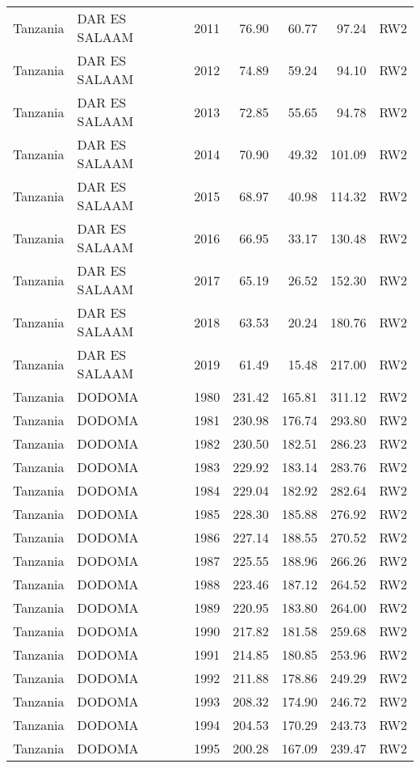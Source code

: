 \begin{longtable}{lllrrrl}
  Tanzania & DAR ES SALAAM & 2011 & 76.90 & 60.77 & 97.24 & RW2 \\ 
  Tanzania & DAR ES SALAAM & 2012 & 74.89 & 59.24 & 94.10 & RW2 \\ 
  Tanzania & DAR ES SALAAM & 2013 & 72.85 & 55.65 & 94.78 & RW2 \\ 
  Tanzania & DAR ES SALAAM & 2014 & 70.90 & 49.32 & 101.09 & RW2 \\ 
  Tanzania & DAR ES SALAAM & 2015 & 68.97 & 40.98 & 114.32 & RW2 \\ 
  Tanzania & DAR ES SALAAM & 2016 & 66.95 & 33.17 & 130.48 & RW2 \\ 
  Tanzania & DAR ES SALAAM & 2017 & 65.19 & 26.52 & 152.30 & RW2 \\ 
  Tanzania & DAR ES SALAAM & 2018 & 63.53 & 20.24 & 180.76 & RW2 \\ 
  Tanzania & DAR ES SALAAM & 2019 & 61.49 & 15.48 & 217.00 & RW2 \\ 
  Tanzania & DODOMA & 1980 & 231.42 & 165.81 & 311.12 & RW2 \\ 
  Tanzania & DODOMA & 1981 & 230.98 & 176.74 & 293.80 & RW2 \\ 
  Tanzania & DODOMA & 1982 & 230.50 & 182.51 & 286.23 & RW2 \\ 
  Tanzania & DODOMA & 1983 & 229.92 & 183.14 & 283.76 & RW2 \\ 
  Tanzania & DODOMA & 1984 & 229.04 & 182.92 & 282.64 & RW2 \\ 
  Tanzania & DODOMA & 1985 & 228.30 & 185.88 & 276.92 & RW2 \\ 
  Tanzania & DODOMA & 1986 & 227.14 & 188.55 & 270.52 & RW2 \\ 
  Tanzania & DODOMA & 1987 & 225.55 & 188.96 & 266.26 & RW2 \\ 
  Tanzania & DODOMA & 1988 & 223.46 & 187.12 & 264.52 & RW2 \\ 
  Tanzania & DODOMA & 1989 & 220.95 & 183.80 & 264.00 & RW2 \\ 
  Tanzania & DODOMA & 1990 & 217.82 & 181.58 & 259.68 & RW2 \\ 
  Tanzania & DODOMA & 1991 & 214.85 & 180.85 & 253.96 & RW2 \\ 
  Tanzania & DODOMA & 1992 & 211.88 & 178.86 & 249.29 & RW2 \\ 
  Tanzania & DODOMA & 1993 & 208.32 & 174.90 & 246.72 & RW2 \\ 
  Tanzania & DODOMA & 1994 & 204.53 & 170.29 & 243.73 & RW2 \\ 
  Tanzania & DODOMA & 1995 & 200.28 & 167.09 & 239.47 & RW2 \\ 

\end{longtable}
